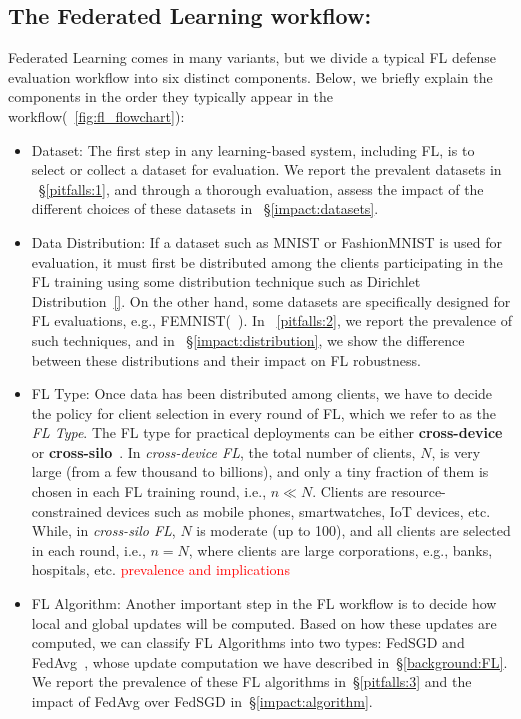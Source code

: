 \subsection{The Federated Learning workflow:}\label{method:workflow}
Federated Learning comes in many variants, but we divide a typical FL defense evaluation workflow into six distinct components. Below, we briefly explain the components in the order they typically appear in the workflow(~\ref{fig:fl_flowchart}):
\begin{itemize}
    \item Dataset: The first step in any learning-based system, including FL, is to select or collect a dataset for evaluation. We report the prevalent datasets in ~\S\ref{pitfalls:1}, and through a thorough evaluation, assess the impact of the different choices of these datasets in ~\S\ref{impact:datasets}.
    \item Data Distribution: If a dataset such as MNIST or FashionMNIST is used for evaluation, it must first be distributed among the clients participating in the FL training using some distribution technique such as Dirichlet Distribution~\ref{}. On the other hand, some datasets are specifically designed for FL evaluations, e.g., FEMNIST(~\cite{caldas2018leaf}). In ~\ref{pitfalls:2}, we report the prevalence of such techniques, and in ~\S\ref{impact:distribution}, we show the difference between these distributions and their impact on FL robustness.
    \item FL Type: Once data has been distributed among clients, we have to decide the policy for client selection in every round of FL, which we refer to as the \emph{FL Type}.
    The FL type for practical deployments can be either \textbf{cross-device} or \textbf{cross-silo}~\cite{kairouz2019advances}. In \emph{cross-device FL}, the total number of clients, $N$, is very large (from a few thousand to billions), and only a tiny fraction of them is chosen in each FL training round, i.e., $n\ll N$. Clients are resource-constrained devices such as mobile phones, smartwatches, IoT devices, etc. While, in \emph{cross-silo FL}, $N$ is moderate (up to 100), and all clients are selected in each round, i.e., $n=N$, where clients are large corporations, e.g., banks, hospitals, etc. \textcolor{red}{prevalence and implications}
    \item FL Algorithm: Another important step in the FL workflow is to decide how local and global updates will be computed. Based on how these updates are computed, we can classify FL Algorithms into two types: FedSGD and FedAvg~\cite{mcmahan2017communication}, whose update computation we have described in~\S\ref{background:FL}. We report the prevalence of these FL algorithms in~\S\ref{pitfalls:3} and the impact of FedAvg over FedSGD in~\S\ref{impact:algorithm}.

\end{itemize}
